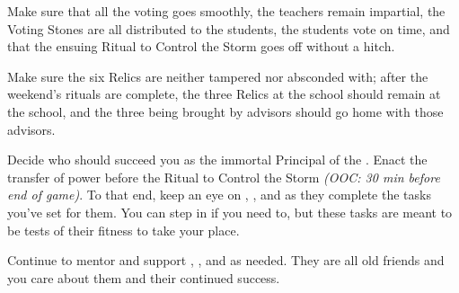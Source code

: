 \documentclass[char]{GL2020}
\begin{document}
\begin{itemz}[Goals]
    \item Make sure that all the voting goes smoothly, the teachers remain impartial, the Voting Stones are all distributed to the students, the students vote on time, and that the ensuing Ritual to Control the Storm goes off without a hitch.
    \item Make sure the six Relics are neither tampered nor absconded with; after the weekend's rituals are complete, the three Relics at the school should remain at the school, and the three being brought by advisors should go home with those advisors.
    \item Decide who should succeed you as the immortal Principal of the \pSchool{}. Enact the transfer of power before the Ritual to Control the Storm \emph{(OOC: 30 min before end of game)}. To that end, keep an eye on \cMusic{}, \cChupSecond{}, and \cBeetle{} as they complete the tasks you've set for them. You can step in if you need to, but these tasks are meant to be tests of their fitness to take your place.
    \item Continue to mentor and support \cBunker{}, \cEthics{}, and \cLibrarian{} as needed. They are all old friends and you care about them and their continued success.
\end{itemz}
\end{document}
